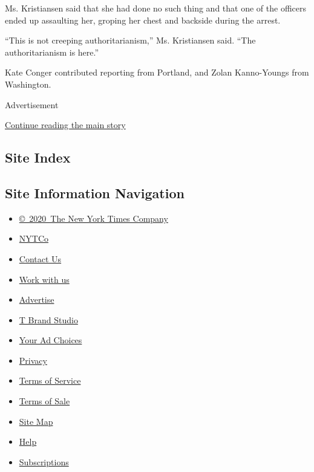 Ms. Kristiansen said that she had done no such thing and that one of the
officers ended up assaulting her, groping her chest and backside during
the arrest.

``This is not creeping authoritarianism,'' Ms. Kristiansen said. ``The
authoritarianism is here.''

Kate Conger contributed reporting from Portland, and Zolan Kanno-Youngs
from Washington.

Advertisement

\protect\hyperlink{after-bottom}{Continue reading the main story}

\hypertarget{site-index}{%
\subsection{Site Index}\label{site-index}}

\hypertarget{site-information-navigation}{%
\subsection{Site Information
Navigation}\label{site-information-navigation}}

\begin{itemize}
\tightlist
\item
  \href{https://help.nytimes.com/hc/en-us/articles/115014792127-Copyright-notice}{©~2020~The
  New York Times Company}
\end{itemize}

\begin{itemize}
\tightlist
\item
  \href{https://www.nytco.com/}{NYTCo}
\item
  \href{https://help.nytimes.com/hc/en-us/articles/115015385887-Contact-Us}{Contact
  Us}
\item
  \href{https://www.nytco.com/careers/}{Work with us}
\item
  \href{https://nytmediakit.com/}{Advertise}
\item
  \href{http://www.tbrandstudio.com/}{T Brand Studio}
\item
  \href{https://www.nytimes.com/privacy/cookie-policy\#how-do-i-manage-trackers}{Your
  Ad Choices}
\item
  \href{https://www.nytimes.com/privacy}{Privacy}
\item
  \href{https://help.nytimes.com/hc/en-us/articles/115014893428-Terms-of-service}{Terms
  of Service}
\item
  \href{https://help.nytimes.com/hc/en-us/articles/115014893968-Terms-of-sale}{Terms
  of Sale}
\item
  \href{https://spiderbites.nytimes.com}{Site Map}
\item
  \href{https://help.nytimes.com/hc/en-us}{Help}
\item
  \href{https://www.nytimes.com/subscription?campaignId=37WXW}{Subscriptions}
\end{itemize}

